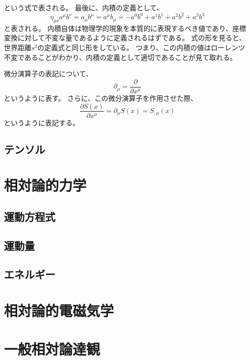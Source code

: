 \documentclass[a4paper]{jsreport}
\begin{document}
            という式で表される。
            最後に、内積の定義として、
            \begin{equation}
                \eta_{\mu\nu}a^{\mu} b^{\nu} = a_{\mu} b^{\mu} = a^{\mu} b_{\mu} = - a^0 b^0 + a^1 b^1 + a^2 b^2 + a^3 b^3
            \end{equation}
            と表される。
            内積自体は物理学的現象を本質的に表現するべき値であり、座標変換に対して不変な量であるように定義されるはずである。
            式の形を見ると、世界距離$s^2$の定義式と同じ形をしている。
            つまり、この内積の値はローレンツ不変であることがわかり、内積の定義として適切であることが見て取れる。\par
            微分演算子の表記について、
            \begin{equation}
                \partial_{\mu} = \frac{\partial}{\partial x^{\mu}}
            \end{equation}
            というように表す。
            さらに、この微分演算子を作用させた際、
            \begin{equation}
                \frac{\partial S(x)}{\partial x^\mu} = \partial_{\mu} S(x) = S_{,\mu}(x)
            \end{equation}
            というように表記する。


            \section{テンソル}


    \chapter{相対論的力学}
        \section{運動方程式}
        \section{運動量}
        \section{エネルギー}

    \chapter{相対論的電磁気学}
    \chapter{一般相対論達観}
\end{document}
